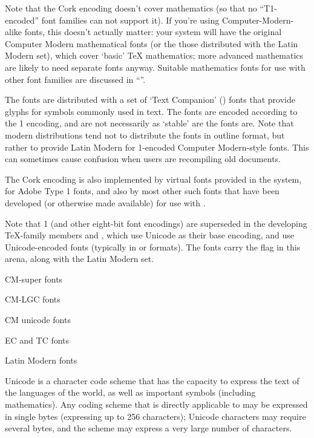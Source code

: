 Note that the Cork encoding doesn't cover mathematics (so that no
``T1-encoded'' font families can not support it).  If you're using
Computer-Modern-alike fonts, this doesn't actually matter: your system
will have the original Computer Modern mathematical fonts (or the
those distributed with the Latin Modern set), which cover `basic' \TeX{}
mathematics; more advanced mathematics are likely to need separate
fonts anyway.  Suitable mathematics fonts for use with other font
families are discussed in %
``''.

The  fonts are distributed with a set of `Text Companion' () fonts
that provide glyphs for symbols commonly used in text. The  fonts
are encoded according to the \latex{} 1 encoding, and are not
necessarily as `stable' are the  fonts are.  Note that modern
distributions tend not to distribute the  fonts in outline format, but
rather to provide Latin Modern for 1-encoded Computer Modern-style
fonts.  This can sometimes cause confusion when users are recompiling
old documents.

The Cork encoding is also implemented by virtual fonts provided in the
 system, for Adobe Type 1 fonts, and also by most other such
fonts that have been developed (or otherwise made available) for use
with \alltex{}. 

Note that 1 (and other eight-bit font encodings) are superseded in
the developing \TeX{}-family members  and
, which use Unicode as their base encoding,
and use Unicode-encoded fonts (typically in  or
 formats).  The  fonts carry the
flag in this arena, along with the Latin Modern set.
\begin{ctanrefs}
\item[CM-super fonts]
\item[CM-LGC fonts]
\item[CM unicode fonts]
\item[EC and TC fonts]
\item[Latin Modern fonts]
\end{ctanrefs}


Unicode is a character code scheme that has the capacity to express
the text of the languages of the world, as well as important symbols
(including mathematics).  Any coding scheme that is directly
applicable to \tex{} may be expressed in single bytes (expressing up
to 256 characters); Unicode characters may require several bytes, and
the scheme may express a very large number of characters.


